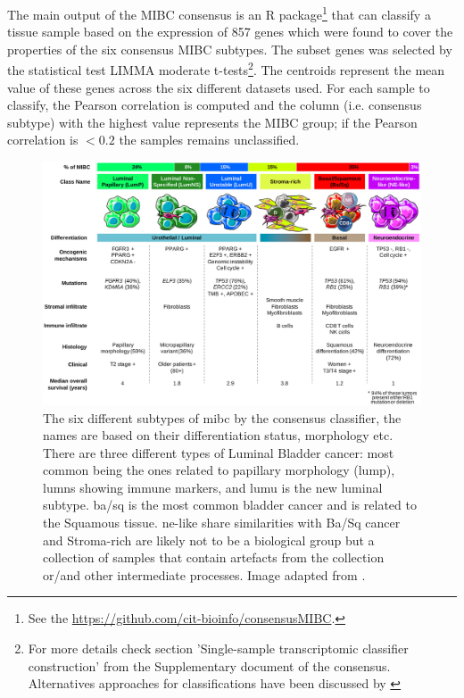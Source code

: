 The main output of the MIBC consensus is an R package\footnote{See the \url{https://github.com/cit-bioinfo/consensusMIBC}.} that can classify a tissue sample based on the expression of 857 genes which were found to cover the properties of the six consensus MIBC subtypes. The subset genes was selected by the statistical test LIMMA moderate t-tests\footnote{For more details check section 'Single-sample transcriptomic classifier construction' from the Supplementary document of the consensus. Alternatives approaches for classifications have been discussed by \citet{Eriksson2022-vw}}. The centroids represent the mean value of these genes across the six different datasets used. For each sample to classify, the Pearson correlation is computed and the column (i.e. consensus subtype) with the highest value represents the MIBC group; if the Pearson correlation is $<0.2$ the samples remains unclassified. 

\begin{figure}[!t]   
\centering
\includegraphics[width=1.0\textwidth,height=1.0\textheight,keepaspectratio]{Sections/Lit_review/Resources/2020_consensus_subtypes.jpg}
  \caption{The six different subtypes of \acrfull{mibc} by the consensus classifier\cite{Kamoun2020-tj}, the names are based on their differentiation status, morphology etc. There are three different types of Luminal Bladder cancer: most common being the ones related to papillary morphology (\acrfull{lump}), \acrfull{lumns} showing immune markers, and \acrfull{lumu} is the new luminal subtype. \acrfull{ba/sq} is the most common bladder cancer and is related to the Squamous tissue. \acrfull{ne-like} share similarities with Ba/Sq cancer and Stroma-rich are likely not to be a biological group but a collection of samples that contain artefacts from the collection or/and other intermediate processes. Image adapted from \cite{Kamoun2020-tj}.
}
\label{fig:lit:2020_consens}
\end{figure}
\FloatBarrier


